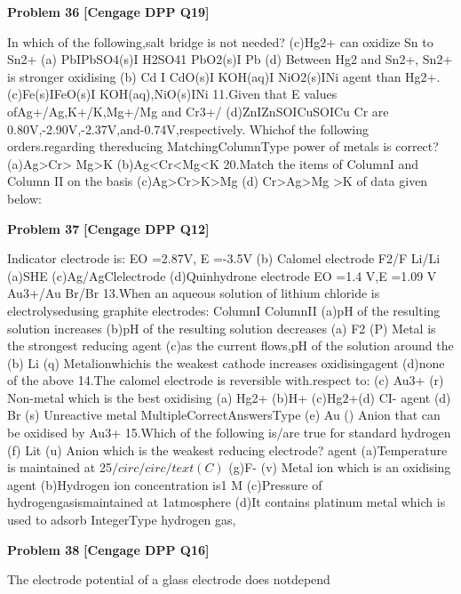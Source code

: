 \begin{problembox}
\textbf{Problem 36} \hfill \textbf{[Cengage DPP Q19]}
\label{q:ext-cng_dpp_all_questions-36}

In which of the following,salt bridge is not needed?
(c)Hg2+ can oxidize Sn to Sn2+
(a) PbIPbSO4(s)I H2SO41 PbO2(s)I Pb
(d) Between Hg2 and Sn2+, Sn2+ is stronger oxidising
(b) Cd I CdO(s)I KOH(aq)I NiO2(s)INi
agent than Hg2+.
(c)Fe(s)IFeO(s)I KOH(aq),NiO(s)INi
11.Given that E values ofAg+/Ag,K+/K,Mg+/Mg and Cr3+/
(d)ZnIZnSOICuSOICu
Cr are 0.80V,-2.90V,-2.37V,and-0.74V,respectively.
Whichof the following orders.regarding thereducing
MatchingColumnType
power of metals is correct?
(a)Ag>Cr> Mg>K
(b)Ag<Cr<Mg<K
20.Match the items of ColumnI and Column II on the basis
(c)Ag>Cr>K>Mg
(d) Cr>Ag>Mg >K
of data given below:
\end{problembox}

\begin{problembox}
\textbf{Problem 37} \hfill \textbf{[Cengage DPP Q12]}
\label{q:ext-cng_dpp_all_questions-37}

Indicator clectrode is:
EO
=2.87V, 
E
=-3.5V
(b) Calomel electrode
F2/F
Li/Li
(a)SHE
(c)Ag/AgClelectrode
(d)Quinhydrone electrode
EO
=1.4 V,E
=1.09 V
Au3+/Au
Br/Br
13.When an aqueous solution of lithium chloride is
electrolysedusing graphite electrodes:
ColumnI
ColumnII
(a)pH of the resulting solution increases
(b)pH of the resulting solution decreases
(a)
F2
(P)
Metal is the strongest reducing agent
(c)as the current flows,pH of the solution around the
(b)
Li
(q)
Metalionwhichis the weakest
cathode increases
oxidisingagent
(d)none of the above
14.The calomel electrode is reversible with.respect to:
(c)
Au3+
(r)
Non-metal which is the best oxidising
(a) Hg2+
(b)H+
(c)Hg$2$+(d) CI-
agent
(d)
Br
(s)
Unreactive metal
MultipleCorrectAnswersType
(e)
Au
()
Anion that can be oxidised by Au3+
15.Which of the following is/are true for standard hydrogen
(f)
Lit
(u)
Anion which is the weakest reducing
electrode?
agent
(a)Temperature is maintained at 25$/circ$$/circ/text(C)$
(g)F-
(v)
Metal ion which is an oxidising agent
(b)Hydrogen ion concentration is1 M
(c)Pressure of hydrogengasismaintained at 1atmosphere
(d)It contains platinum metal which is used to adsorb
IntegerType
hydrogen gas, 
\end{problembox}

\begin{problembox}
\textbf{Problem 38} \hfill \textbf{[Cengage DPP Q16]}
\label{q:ext-cng_dpp_all_questions-38}

The electrode potential of a glass electrode does notdepend
\end{problembox}

